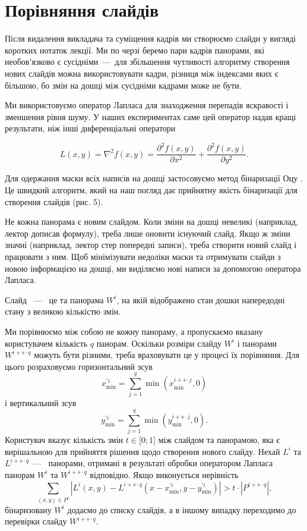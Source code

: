 \section{Порівняння слайдів}

Після видалення викладача та суміщення кадрів ми створюємо слайди у вигляді
коротких нотаток лекції. Ми по черзі беремо пари кадрів панорами, які
необов'язково є сусідніми~---~для збільшення чутливості алгоритму створення нових
слайдів можна використовувати кадри, різниця між індексами яких є більшою, бо
змін на дошці між сусідніми кадрами може не бути.

Ми використовуємо оператор Лапласа  для знаходження перепадів
яскравості і зменшення рівня шуму. У наших експериментах саме цей
оператор надав кращі результати, ніж інші диференціальні оператори

\begin{equation*}
  L(x,y) = \nabla^{2}f(x,y) = \frac{\partial^{2}f(x,y)}{\partial x^{2}} + \frac{\partial^{2}f(x,y)}{\partial y^{2}}.
\end{equation*}

Для одержання маски всіх написів на дошці застосовуємо метод бінаризації
Оцу . Це швидкий алгоритм, який на наш погляд дає прийнятну
якість бінаризації для створення слайдів (рис. 5).

Не кожна панорама є новим слайдом. Коли зміни на дошці невеликі
(наприклад, лектор дописав формулу), треба лише оновити існуючий слайд.
Якщо ж зміни значні (наприклад, лектор стер попередні записи), треба
створити новий слайд і працювати з ним. Щоб мінімізувати недоліки маски
та отримувати слайди з новою інформацією на дошці, ми виділяємо нові
написи за допомогою оператора Лапласа.

\begin{definition}
  Слайд ~---~ це та панорама \(W^{i}\), на якій відображено стан дошки
  напередодні стану з великою кількістю змін.
\end{definition}
Ми порівнюємо між собою не
кожну панораму, а пропускаємо вказану користувачем кількість \(q\)
панорам. Оскільки розміри слайду \(W^{i}\) і панорами
\(W^{i + s \cdot q}\) можуть бути різними, треба враховувати це у
процесі їх порівняння. Для цього розраховуємо горизонтальний зсув
$$x_{\min}^{'i} = \sum_{j = 1}^{q}{\min\left( x_{\min}^{i + s \cdot j},0 \right)}$$
і вертикальний зсув
$$y_{\min}^{'i} = \sum_{j = 1}^{q}{\min\left( y_{\min}^{i + s \cdot j},0 \right)}.$$
Користувач вказує кількість змін \(t \in \lbrack 0;1\rbrack\) між
слайдом та панорамою, яка є вирішальною для прийняття рішення щодо
створення нового слайду. Нехай \(L^{i}\) та \(L^{i + s \cdot q}\)~---~
панорами, отримані в результаті обробки оператором Лапласа панорам \(W^{i}\) та
\(W^{i + s \cdot q}\) відповідно. Якщо виконується нерівність
\begin{equation*}
  \sum_{(x,y) \in P^{i}}^{}| L^{i}(x,y) - L^{i + s \cdot q}( x - x_{\min}^{'i},y - y_{\min}^{'i} ) | > t \cdot | P^{i + s \cdot q} |,
\end{equation*}
бінаризовану \(W^{i}\) додаємо до списку слайдів, а в іншому випадку переходимо до
перевірки слайду \(W^{i + s \cdot q}\).
